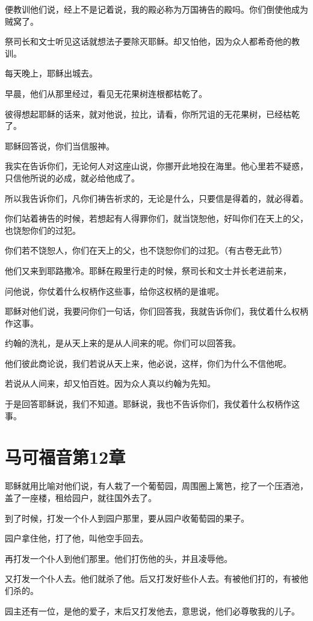 \documentclass[12pt,oneside]{book}
\begin{document}
便教训他们说，经上不是记着说，我的殿必称为万国祷告的殿吗。你们倒使他成为贼窝了。

祭司长和文士听见这话就想法子要除灭耶稣。却又怕他，因为众人都希奇他的教训。

每天晚上，耶稣出城去。

早晨，他们从那里经过，看见无花果树连根都枯乾了。

彼得想起耶稣的话来，就对他说，拉比，请看，你所咒诅的无花果树，已经枯乾了。

耶稣回答说，你们当信服神。

我实在告诉你们，无论何人对这座山说，你挪开此地投在海里。他心里若不疑惑，只信他所说的必成，就必给他成了。

所以我告诉你们，凡你们祷告祈求的，无论是什么，只要信是得着的，就必得着。

你们站着祷告的时候，若想起有人得罪你们，就当饶恕他，好叫你们在天上的父，也饶恕你们的过犯。

你们若不饶恕人，你们在天上的父，也不饶恕你们的过犯。（有古卷无此节）

他们又来到耶路撒冷。耶稣在殿里行走的时候，祭司长和文士并长老进前来，

问他说，你仗着什么权柄作这些事，给你这权柄的是谁呢。

耶稣对他们说，我要问你们一句话，你们回答我，我就告诉你们，我仗着什么权柄作这事。

约翰的洗礼，是从天上来的是从人间来的呢。你们可以回答我。

他们彼此商论说，我们若说从天上来，他必说，这样，你们为什么不信他呢。

若说从人间来，却又怕百姓。因为众人真以约翰为先知。

于是回答耶稣说，我们不知道。耶稣说，我也不告诉你们，我仗着什么权柄作这事。

\chapter{马可福音第12章}
耶稣就用比喻对他们说，有人栽了一个葡萄园，周围圈上篱笆，挖了一个压酒池，盖了一座楼，租给园户，就往国外去了。

到了时候，打发一个仆人到园户那里，要从园户收葡萄园的果子。

园户拿住他，打了他，叫他空手回去。

再打发一个仆人到他们那里。他们打伤他的头，并且凌辱他。

又打发一个仆人去。他们就杀了他。后又打发好些仆人去。有被他们打的，有被他们杀的。

园主还有一位，是他的爱子，末后又打发他去，意思说，他们必尊敬我的儿子。
\end{document}
